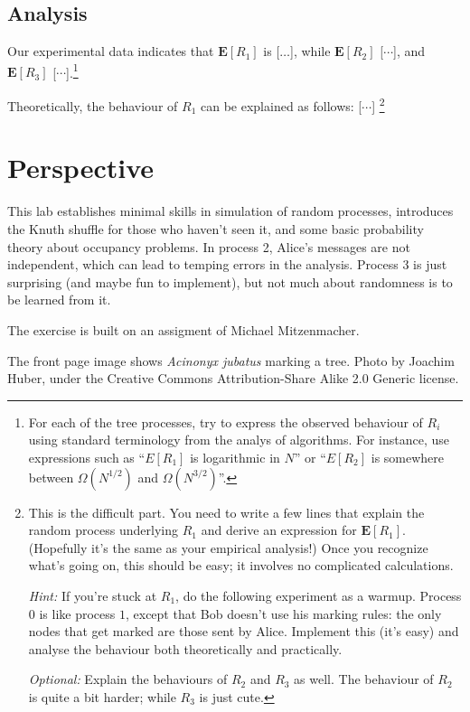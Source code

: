 \documentclass{tufte-handout}
\begin{document}
\subsection{Analysis}

Our experimental data indicates that $\mathbf E [R_1]$ is [$\ldots$],
while $\mathbf E[R_2]$ [$\cdots$], and $\mathbf E[R_3]$
[$\cdots$].\footnote{For each of the tree processes, try to express
  the observed behaviour of $R_i$ using standard terminology from the
  analys of algorithms.
  For instance, use expressions such as ``$E[R_1]$ is logarithmic in
  $N$'' or ``$E[R_2]$ is somewhere between $\Omega(N^{1/2})$ and
  $\Omega(N^{3/2})$''.}

Theoretically, the behaviour of $R_1$ can be explained as follows: [$\cdots$] \footnote{This
  is the difficult part.
  You need to write a few lines that explain the random process
  underlying $R_1$ and derive an expression for $\mathbf E[R_1]$.
  (Hopefully it's the same as your empirical analysis!)
  Once you recognize what's going on, this should be easy; it involves
  no complicated calculations.

  \emph{Hint:} If you're stuck at $R_1$, do the following experiment
  as a warmup.
  Process $0$ is like process $1$, except that Bob doesn't use his
  marking rules: the only nodes that get marked are those sent by
  Alice. Implement this (it's easy) and analyse the behaviour both
  theoretically and practically. 

  \emph{Optional:} Explain the
  behaviours of $R_2$ and $R_3$ as well.
  The behaviour of $R_2$ is quite a bit harder; while $R_3$ is just
  cute.
}



\newpage
\section{Perspective}

This lab establishes minimal skills in simulation of random processes,
introduces the Knuth shuffle for those who haven't seen it, and some
basic probability theory about occupancy problems.
In process 2, Alice's messages are not independent, which can lead to
temping errors in the analysis.
Process 3 is just surprising (and maybe fun to implement), but not
much about randomness is to be learned from it.

The exercise is built on an assigment of Michael
Mitzenmacher.

The front page image shows \emph{Acinonyx jubatus} marking a
tree. Photo by Joachim Huber, under the Creative Commons Attribution-Share
Alike 2.0 Generic license.
\end{document}
